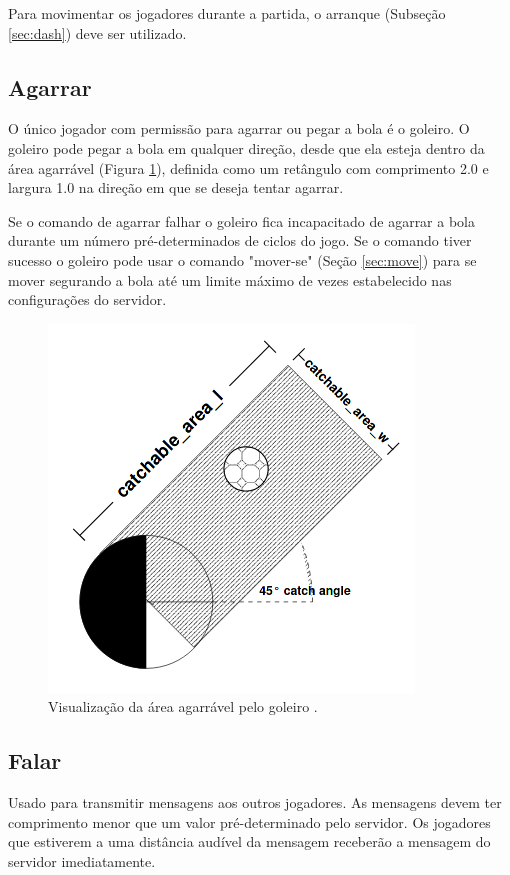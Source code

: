 Para movimentar os jogadores durante a partida, o arranque (Subseção \ref{sec:dash}) deve ser utilizado.

\subsection{Agarrar}

O único jogador com permissão para agarrar ou pegar a bola é o goleiro. O goleiro pode pegar a bola em qualquer direção, desde que ela esteja dentro da área agarrável (Figura \ref{fig:catch}), definida como um retângulo com comprimento 2.0 e largura 1.0 na direção em que se deseja tentar agarrar.

Se o comando de agarrar falhar o goleiro fica incapacitado de agarrar a bola durante um número pré-determinados de ciclos do jogo. Se o comando tiver sucesso o goleiro pode usar o comando "mover-se" (Seção \ref{sec:move}) para se mover segurando a bola até um limite máximo de vezes estabelecido nas configurações do servidor.

\begin{figure}[H]
	\includegraphics[width=0.5\linewidth]{figs/catch.png}
	\centering
	\caption{Visualização da área agarrável pelo goleiro \cite{rcssmanual2003}.}
	\label{fig:catch}
\end{figure}

\subsection{Falar}

Usado para transmitir mensagens aos outros jogadores. As mensagens devem ter comprimento menor que um valor pré-determinado pelo servidor. Os jogadores que estiverem a uma distância audível da mensagem receberão a mensagem do servidor imediatamente.

